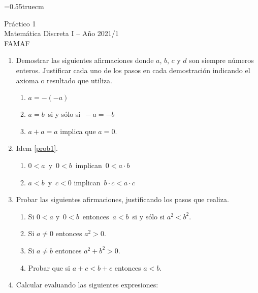 \documentclass[a4paper,12pt,twoside,spanish,reqno]{amsbook}
\numberwithin{equation}{section}
\begin{document}
    \baselineskip=0.55truecm %
    

{\bf \begin{center}\large  Práctico 1 \\ Matemática Discreta I -- Año 2021/1 \\ FAMAF \end{center}}


\begin{enumerate}
\item\label{prob1} Demostrar las siguientes afirmaciones donde $a$, $b$, $c$ y $d$ son siempre números enteros. Justificar cada uno de los pasos en cada demostración indicando el axioma o resultado que utiliza.
\begin{enumerate}
\item  $a=-(-a)$
\item  $a=b\,$ si y sólo si $\,-a=-b$
\item  $a+a=a$ implica que  $a=0$.
\end{enumerate}




\item Idem \ref{prob1}.

\begin{enumerate}
 \item $0<a\,$ y $\,0<b\,$ implican $\,0<a\cdot b$
 \item $a<b\,$ y $\,c<0$ implican $\,b\cdot c<a\cdot c$
\end{enumerate}



\item  Probar las siguientes afirmaciones, justificando los pasos que realiza.
\begin{enumerate}
  \item Si $0 < a$  y $\,0<b\,$ entonces $\,a<b\,$ si y sólo si $a^2<b^2$.
  \item Si $a\neq 0$  entonces $a^2>0$.
  \item Si $a\neq b$  entonces $a^2+b^2>0$.
  \item Probar que si $a+c <b+c$ entonces $a<b$.
\end{enumerate}





\item Calcular evaluando las siguientes expresiones:
\end{enumerate}
\end{document}
